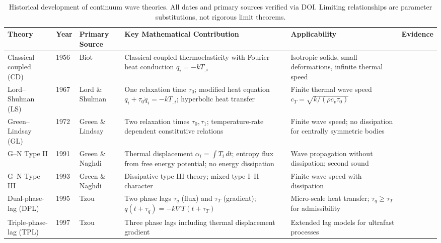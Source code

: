 \begin{table}[h]
\centering
\small
\caption{Historical development of continuum wave theories. All dates and primary sources verified via DOI. Limiting relationships are parameter substitutions, not rigorous limit theorems.}
\label{tab:T1-historical}
\begin{tabularx}{\textwidth}{@{}lllXXl@{}}
\toprule
\textbf{Theory} & \textbf{Year} & \textbf{Primary Source} & \textbf{Key Mathematical Contribution} & \textbf{Applicability} & \textbf{Evidence} \\
\midrule
Classical coupled (CD) & 1956 & Biot \cite{Biot1956} & Classical coupled thermoelasticity with Fourier heat conduction $q_i=-kT_{,i}$ & Isotropic solids, small deformations, infinite thermal speed & \cite{Biot1956} \\
Lord--Shulman (LS) & 1967 & Lord \& Shulman \cite{Lord1967} & One relaxation time $\tau_0$; modified heat equation $q_i+\tau_0\dot{q}_i=-kT_{,i}$; hyperbolic heat transfer & Finite thermal wave speed $c_T=\sqrt{k/(\rho c_v\tau_0)}$ & \cite{Lord1967} \\
Green--Lindsay (GL) & 1972 & Green \& Lindsay \cite{Green1972} & Two relaxation times $\tau_0,\tau_1$; temperature-rate dependent constitutive relations & Finite wave speed; no dissipation for centrally symmetric bodies & \cite{Green1972} \\
G--N Type II & 1991 & Green \& Naghdi \cite{Green1991} & Thermal displacement $\alpha_i=\int T_i\,dt$; entropy flux from free energy potential; no energy dissipation & Wave propagation without dissipation; second sound & \cite{Green1991} \\
G--N Type III & 1993 & Green \& Naghdi \cite{Green1993} & Dissipative type III theory; mixed type I--II character & Finite wave speed with dissipation & \cite{Green1993} \\
Dual-phase-lag (DPL) & 1995 & Tzou \cite{Tzou1995} & Two phase lags $\tau_q$ (flux) and $\tau_T$ (gradient); $q(t+\tau_q)=-k\nabla T(t+\tau_T)$ & Micro-scale heat transfer; $\tau_q\ge\tau_T$ for admissibility & \cite{Tzou1995} \\
Triple-phase-lag (TPL) & 1997 & Tzou \cite{Tzou1997} & Three phase lags including thermal displacement gradient & Extended lag models for ultrafast processes & \cite{Tzou1997} \\

\end{tabularx}
\end{table}
